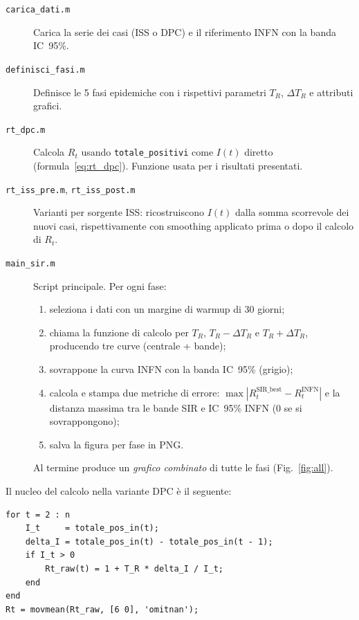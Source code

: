 \documentclass[12pt, a4paper]{article}
\begin{document}
\begin{description}
    \item[\texttt{carica\_dati.m}] Carica la serie dei casi (ISS o DPC) e il riferimento
        INFN con la banda IC~95\%.

    \item[\texttt{definisci\_fasi.m}] Definisce le 5 fasi epidemiche con i rispettivi
        parametri $T_R$, $\Delta T_R$ e attributi grafici.

    \item[\texttt{rt\_dpc.m}] Calcola $R_t$ usando \texttt{totale\_positivi} come $I(t)$
        diretto (formula~\eqref{eq:rt_dpc}). Funzione usata per i risultati presentati.

    \item[\texttt{rt\_iss\_pre.m}, \texttt{rt\_iss\_post.m}]
        Varianti per sorgente ISS: ricostruiscono $I(t)$ dalla somma scorrevole dei nuovi
        casi, rispettivamente con smoothing applicato prima o dopo il calcolo di $R_t$.

    \item[\texttt{main\_sir.m}] Script principale. Per ogni fase:
        \begin{enumerate}
            \item seleziona i dati con un margine di warmup di 30 giorni;
            \item chiama la funzione di calcolo per $T_R$, $T_R - \Delta T_R$ e
                  $T_R + \Delta T_R$, producendo tre curve (centrale + bande);
            \item sovrappone la curva INFN con la banda IC~95\% (grigio);
            \item calcola e stampa due metriche di errore:
                  $\max|R_t^{\text{SIR\_best}} - R_t^{\text{INFN}}|$ e
                  la distanza massima tra le bande SIR e IC~95\% INFN (0 se si sovrappongono);
            \item salva la figura per fase in PNG.
        \end{enumerate}
        Al termine produce un \emph{grafico combinato} di tutte le fasi (Fig.~\ref{fig:all}).
\end{description}

Il nucleo del calcolo nella variante DPC è il seguente:
\begin{lstlisting}[style=matlab, caption={Estratto da \texttt{rt\_dpc.m}.}]
for t = 2 : n
    I_t     = totale_pos_in(t);
    delta_I = totale_pos_in(t) - totale_pos_in(t - 1);
    if I_t > 0
        Rt_raw(t) = 1 + T_R * delta_I / I_t;
    end
end
Rt = movmean(Rt_raw, [6 0], 'omitnan');
\end{lstlisting}
\end{document}
